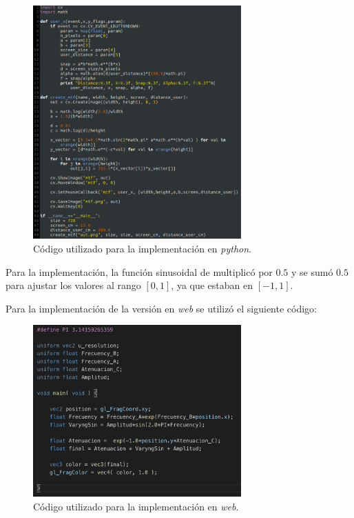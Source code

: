 \documentclass[conference]{IEEEtran}
\begin{document}
\begin{figure}[htbp]
\centerline{\includegraphics[width=80mm]{code/code1}}
\caption{Código utilizado para la implementación en \textit{python}.}
\label{code1}
\end{figure}

Para la implementación, la función sinusoidal de multiplicó por $0.5$ y se sumó $0.5$ para ajustar los valores al rango  $[0,1]$, ya que estaban en $[-1,1]$.


Para la implementación de la versión en \textit{web} se utilizó el siguiente código:

\begin{figure}[htbp]
\centerline{\includegraphics[width=80mm]{code/shaderCode}}
\caption{Código utilizado para la implementación en \textit{web}.}
\label{code2}
\end{figure}
\end{document}
